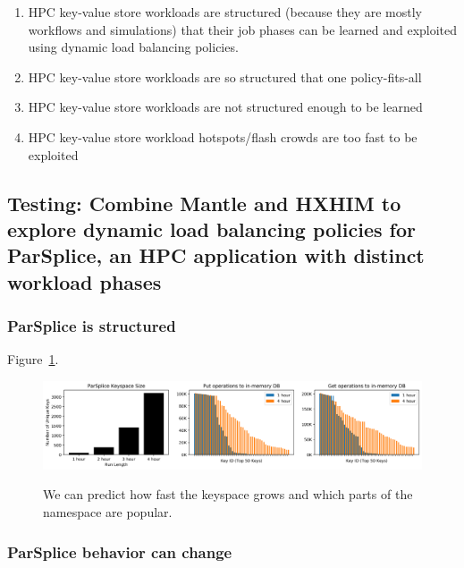 \begin{enumerate}

  \item HPC key-value store workloads are structured (because they are mostly
  workflows and simulations) that their job phases can be learned and exploited
  using dynamic load balancing policies.

  \item HPC key-value store workloads are so structured that one
  policy-fits-all

  \item HPC key-value store workloads are not structured enough to be learned

  \item HPC key-value store workload hotspots/flash crowds are too fast to be
  exploited

\end{enumerate}

\subsection{Testing: Combine Mantle and HXHIM to explore dynamic load balancing
policies for ParSplice, an HPC application with distinct workload phases}

\subsubsection{ParSplice is structured}
Figure~\ref{fig:scale-length}.
\begin{figure}[tbh]
  \noindent\includegraphics[width=1\textwidth]{figures/scale-length.png}\\
  \caption{We can predict how fast the keyspace grows and which parts of the
  namespace are popular.\label{fig:scale-length}}
\end{figure}


\subsubsection{ParSplice behavior can change}

